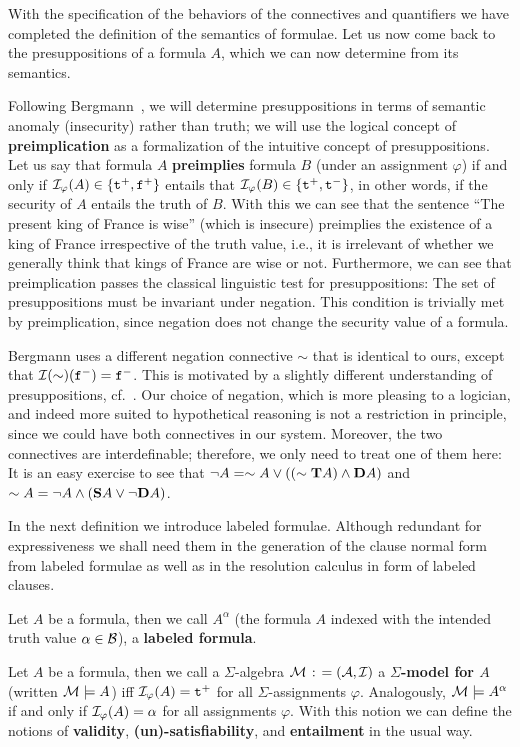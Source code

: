 \documentclass{\filespath jancl}
\def\deq{{\;\colon\kern-.2em=\;}}
\def\phi{\varphi}
\def\cA{{\cal A}}\def\cB{{\cal B}}\def\cC{{\cal C}}
\def\cM{{\cal M}}\def\cN{{\cal N}}\def\cO{{\cal O}}
\let\phi\varphi
\newcommand{\twts}{{{\sf t}^+}}
\newcommand{\twfs}{{{\sf f}^+}}
\newcommand{\twti}{{{\sf t}^-}}
\newcommand{\twfi}{{{\sf f}^-}}
\newcommand{\Tval}{{\cal B}}
\def\tf{{\bf D}}
\def\holds{{\bf T}}
\def\deft{{\bf S}}
\def\sf{\tt}
\begin{document}
With the specification of the behaviors of the connectives and quantifiers we have
completed the definition of the semantics of formulae. Let us now come back to the
presuppositions of a formula $A$, which we can now determine from its semantics.
\begin{remark}
  Following Bergmann~\cite{Bergmann:patdl81}, we will determine presuppositions in terms
  of semantic anomaly (insecurity) rather than truth; we will use the logical
  concept of {\bf preimplication} as a formalization of the intuitive concept of
  presuppositions. Let us say that formula $A$ {\bf preimplies} formula $B$ (under
  an assignment $\phi$) if and only if $\cI_\phi(A)\in\{\twts,\twfs\}$ entails that
  $\cI_\phi(B)\in\{\twts,\twti\}$, in other words, if the security of $A$ entails
  the truth of $B$. With this we can see that the sentence ``The present king of
  France is wise'' (which is insecure) preimplies the existence of a king of
  France irrespective of the truth value, i.e., it is irrelevant of whether we generally
  think that kings of France are wise or not. Furthermore, we can see that
  preimplication passes the classical linguistic test for presuppositions: The set
  of presuppositions must be invariant under negation. This condition is trivially
  met by preimplication, since negation does not change the security value of a
  formula.
\end{remark}

Bergmann uses a different negation connective $\sim$ that is identical to ours, except that
$\cI(\sim)(\twfi)=\twfi$.  This is motivated by a slightly different understanding
of presuppositions, cf.~\cite{Bergmann:patdl81}. Our choice of negation, which is more
pleasing to a logician, and indeed more suited to hypothetical reasoning is not a
restriction in principle, since we could have both connectives in our system.  Moreover, the
two connectives are interdefinable; therefore, we only need to treat one of them
here: It is an easy exercise to see that $\neg A=\sim A\lor((\sim\holds
A)\land \tf A)$ and $\sim A=\neg A\land(\deft A\lor \neg\tf A)$.

In the next definition we introduce labeled formulae. Although
redundant for expressiveness we shall need them in the generation of the
clause normal form from labeled formulae as well as in the resolution
calculus in form of labeled clauses.

\begin{definition}\label{Def:model}
  Let $A$ be a formula, then we call $A^\alpha$ (the formula $A$ indexed with
  the intended truth value $\alpha\in\Tval$), a {\bf labeled formula}. 
  
  Let $A$ be a formula, then we call a $\Sigma$-algebra $\cM\deq(\cA,\cI)$ a
  {\bf $\Sigma$-model for $A$} (written $\cM\models A$) iff
  $\cI_\phi(A)=\twts$ for all $\Sigma$-assignments $\phi$. Analogously,
  $\cM\models A^{\alpha}$ if and only if $\cI_{\phi}(A)=\alpha$ for all assignments
  $\phi$. With this notion we can define the notions of {\bf validity}, {\bf
    (un)-satisfiability}, and {\bf entailment} in the usual way.
\end{definition}
\end{document}
